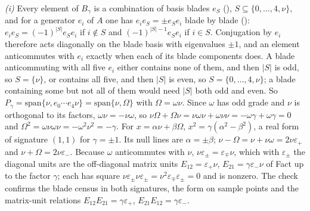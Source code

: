 \emph{(i)} Every element of $B_{\gamma}$ is a combination of basis blades $e_{S}$ (), $S \subseteq \{0, \ldots, 4, \nu\}$, and for a generator $e_{i}$ of $A$ one has $e_{i}e_{S} = \pm e_{S}e_{i}$ blade by blade (): $e_{i}e_{S} = (-1)^{|S|}e_{S}e_{i}$ if $i \notin S$ and $(-1)^{|S|-1}e_{S}e_{i}$ if $i \in S$. Conjugation by $e_{i}$ therefore acts diagonally on the blade basis with eigenvalues $\pm 1$, and an element anticommutes with $e_{i}$ exactly when each of its blade components does. A blade anticommuting with all five $e_{i}$ either contains none of them, and then $|S|$ is odd, so $S = \{\nu\}$, or contains all five, and then $|S|$ is even, so $S = \{0, \ldots, 4, \nu\}$; a blade containing some but not all of them would need $|S|$ both odd and even. So $P_{\gamma} = \mathrm{span}\{\nu, e_{0}\cdots e_{4}\nu\} = \mathrm{span}\{\nu, \Omega\}$ with $\Omega = \omega\nu$. Since $\omega$ has odd grade and $\nu$ is orthogonal to its factors, $\omega\nu = -\nu\omega$, so $\nu\Omega + \Omega\nu = \nu\omega\nu + \omega\nu\nu = -\omega\gamma + \omega\gamma = 0$ and $\Omega^{2} = \omega\nu\omega\nu = -\omega^{2}\nu^{2} = -\gamma$. For $x = \alpha\nu + \beta\Omega$, $x^{2} = \gamma(\alpha^{2} - \beta^{2})$, a real form of signature $(1,1)$ for $\gamma = \pm 1$. Its null lines are $\alpha = \pm\beta$; $\nu - \Omega = \nu + \nu\omega = 2\nu\varepsilon_{+}$ and $\nu + \Omega = 2\nu\varepsilon_{-}$. Because $\omega$ anticommutes with $\nu$, $\nu\varepsilon_{\pm} = \varepsilon_{\mp}\nu$, which with $\varepsilon_{\pm}$ the diagonal units are the off-diagonal matrix units $E_{12} = \varepsilon_{+}\nu$, $E_{21} = \gamma\varepsilon_{-}\nu$ of Fact  up to the factor $\gamma$; each has square $\nu\varepsilon_{\pm}\nu\varepsilon_{\pm} = \nu^{2}\varepsilon_{\mp}\varepsilon_{\pm} = 0$ and is nonzero. The check confirms the blade census in both signatures, the form on sample points and the matrix-unit relations $E_{12}E_{21} = \gamma\varepsilon_{+}$, $E_{21}E_{12} = \gamma\varepsilon_{-}$.

